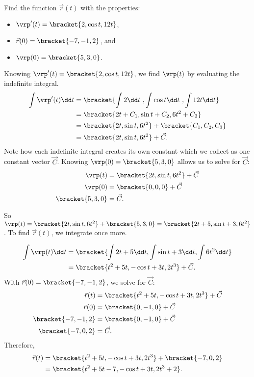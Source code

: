 \begin{example}\label{ex_vvfint2}
Find the function $\vec r(t)$ with the properties:
\begin{itemize}
	\item $\vrp'(t) =\bracket{2, \cos t, 12t}$,
	\item $\vec r(0) =\bracket{-7,-1,2}$, and
	\item	$\vrp(0) =\bracket{5,3,0}$.
\end{itemize}
\solution
Knowing $\vrp'(t) =\bracket{2,\cos t, 12t}$, we find $\vrp(t)$ by evaluating the indefinite integral.
\begin{align*}
\int \vrp'(t)\dd t &=\bracket{\int 2\dd t\ , \int \cos t\dd t\ , \int 12t\dd t}\\
						&=\bracket{2t+C_1, \sin t+ C_2, 6t^2 + C_3}\\
						&=\bracket{2t,\sin t,6t^2}+\bracket{C_1,C_2,C_3}\\
						&=\bracket{2t,\sin t,6t^2}+ \vec C.
\end{align*}
Note how each indefinite integral creates its own constant which we collect as one constant vector $\vec C$. Knowing $\vrp(0) =\bracket{5,3,0}$ allows us to solve for $\vec C$:
\begin{align*}
\vrp(t) & =\bracket{2t,\sin t,6t^2}+ \vec C\\
\vrp(0) &=\bracket{0,0,0}+ \vec C\\
\bracket{5,3,0}&= \vec C.
\end{align*}

So $\vrp(t) =\bracket{2t,\sin t,6t^2}+\bracket{5,3,0}=\bracket{2t+5, \sin t + 3, 6t^2}$. To find $\vec r(t)$, we integrate once more.

\begin{align*}
\int \vrp(t)\dd t &=\bracket{\int 2t+5\dd t, \int \sin t + 3\dd t, \int 6t^2\dd t}\\
							&=\bracket{t^2+5t, -\cos t + 3t, 2t^3}+ \vec C.
\end{align*}
With $\vec r(0) =\bracket{-7,-1,2}$, we solve for $\vec C$:
\begin{align*}
\vec r(t) &=\bracket{t^2+5t, -\cos t + 3t, 2t^3}+ \vec C\\
\vec r(0) &=\bracket{0,-1,0}+ \vec C\\
\bracket{-7,-1,2}&=\bracket{0,-1,0}+ \vec C\\
\bracket{-7,0,2}&= \vec C.
\end{align*}
Therefore,
\begin{align*}
 \vec r(t) &=\bracket{t^2+5t, -\cos t + 3t, 2t^3}+\bracket{-7,0,2}\\
 &=\bracket{t^2+5t-7,-\cos t+3t,2t^3+2}.
\end{align*}
\end{example}

